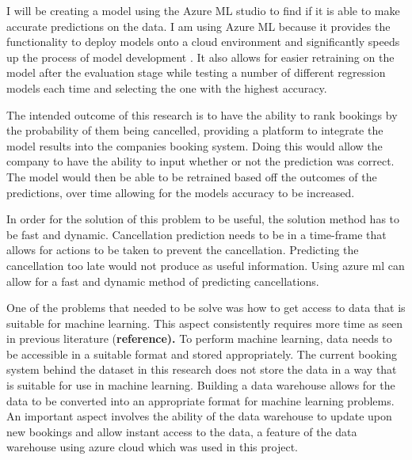 I will be creating a model using the Azure ML studio to find if it is able to make accurate predictions on the data. I am using Azure ML because it provides the functionality to deploy models onto a cloud environment and significantly speeds up the process of model development . It also allows for easier retraining on the model after the evaluation stage while testing a number of different regression models each time and selecting the one with the highest accuracy.

The intended outcome of this research is to have the ability to rank bookings by the probability of them being cancelled, providing a platform to integrate the model results into the companies booking system. Doing this would allow the company to have the ability to input whether or not the prediction was correct. The model would then be able to be retrained based off the outcomes of the predictions, over time allowing for the models accuracy to be increased. 

In order for the solution of this problem to be useful, the solution method has to be fast and dynamic. Cancellation prediction needs to be in a time-frame that allows for actions to be taken to prevent the cancellation. Predicting the cancellation too late would not produce as useful information. Using azure ml can allow for a fast and dynamic method of predicting cancellations. 

One of the problems that needed to be solve was how to get access to data that is suitable for machine learning. This aspect consistently requires more time as seen in previous literature (\textbf{reference).} To perform machine learning, data needs to be accessible in a suitable format and stored appropriately. The current booking system behind the dataset in this research does not store the data in a way that is suitable for use in machine learning. Building a data warehouse allows for the data to be converted into an appropriate format for machine learning problems. An important aspect involves the ability of the data warehouse to update upon new bookings and allow instant access to the data, a feature of the data warehouse using azure cloud which was used in this project. 

